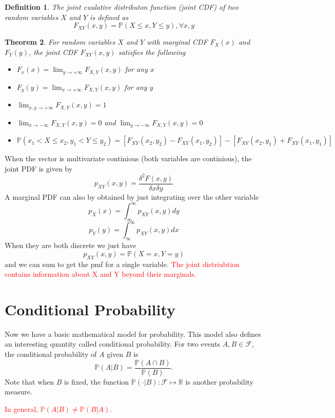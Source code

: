 \documentclass[twoside]{article}
\newcounter{lecnum}
\newcommand{\note}[1]{\textcolor{red}{#1}}
\newtheorem{theorem}{Theorem}[lecnum]
\newtheorem{definition}[theorem]{Definition}
\newcommand{\prob}{\mathbb{P}}
\begin{document}
\begin{definition}
    The joint cuulative distributon function (joint CDF) of two random variables $X$ and $Y$ is defined as 
    $$F_{XY}(x,y)=\prob(X\leq x ,Y\leq y), \forall x,y$$
\end{definition}
\begin{theorem}
For random variables $X$ and $Y$ with marginal CDF $F_X(x)$ and $F_Y(y)$, the joint CDF $F_{XY}(x,y)$ satisfies the following
    \begin{itemize}
        \item [(1)] $F_x(x) = \lim_{y\rightarrow +\infty}F_{X,Y}(x,y)$ for any $x$
        \item [(2)]$F_y(y) = \lim_{x\rightarrow +\infty}F_{X,Y}(x,y)$ for any $y$
        \item [(3)] $\lim_{x,y\rightarrow +\infty}F_{X,Y}(x,y)=1$
        \item [(4)] $\lim_{x\rightarrow -\infty}F_{X,Y}(x,y)=0$ and $\lim_{y\rightarrow -\infty}F_{X,Y}(x,y)=0$ 
        \item [(5)] $\prob(x_1<X\leq x_2,y_1<Y\leq y_2)=[F_{XY}(x_2,y_2)-F_{XY}(x_1,y_2)]-[F_{XY}(x_2,y_1)+F_{XY}(x_1,y_1)]$
     \end{itemize}
\end{theorem}
When the vector is multivariate continious (both variables are continious), the joint PDF is given by 
$$p_{XY}(x,y)=\frac{\delta^2F(x,y)}{\delta x\delta y}$$
A marginal PDF can also by obtained by just integrating over the other variable
$$p_X(x)=\int_{\infty}^\infty p_{XY}(x,y)dy$$
$$p_Y(y)=\int_{\infty}^\infty p_{XY}(x,y)dx$$
When they are both discrete we just have
$$p_{XY}(x,y)= \prob(X=x,Y=y)$$
and we can sum to get the pmf for a single variable.
\note{The joint distriubtion contains information about X and Y beyond their marginals.}

\section{Conditional Probability}
Now we have a basic mathematical model for probability. 
This model also defines an interesting quantity called conditional probability. 
For two events $A,B\in\mathcal{F}$, the conditional probability of $A$ given $B$ is 
$$
\mathbb{P}(A|B) = \frac{\mathbb{P}(A\cap B)}{\mathbb{P}(B)}.
$$
Note that when $B$ is fixed, the function $\mathbb{P}(\cdot|B):\mathcal{F}\mapsto \mathbb{R}$
is another probability measure. 

\note{In general, $\mathbb{P}(A|B)\neq \mathbb{P}(B|A)$. }
\end{document}
